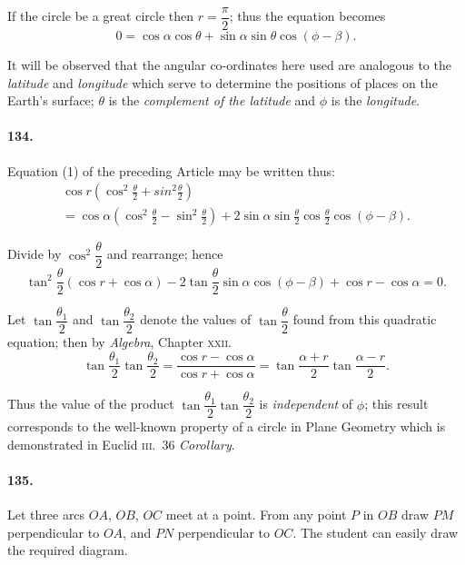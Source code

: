 \documentclass{book}[2004/02/16]
\begin{document}
\begin{mainmatter}
\begin{spacing}{1.3}
If the circle be a great circle then $r = \dfrac{\pi}{2}$; thus the equation
becomes
\[
0 = \cos \alpha \cos \theta + \sin \alpha \sin \theta \cos (\phi - \beta). \tag{2}
\]

It will be observed that the angular co-ordinates here used are
analogous to the \textit{latitude} and \textit{longitude} which serve to determine
the positions of places on the Earth's surface; $\theta$ is the \textit{complement
of the latitude} and $\phi$ is the \textit{longitude}.

\paragraph{134.} Equation (1) of the preceding Article may be written
thus:
\begin{multline*}
\cos r \left(\cos^2 \frac{\theta}{2} + sin^2 \frac{\theta}{2}\right)
\\
= \cos \alpha \left(\cos^2 \frac{\theta}{2}
                  - \sin^2 \frac{\theta}{2}\right)
+ 2 \sin \alpha \sin \frac{\theta}{2} \cos \frac{\theta}{2}
  \cos (\phi - \beta).
\end{multline*}

Divide by $\cos^2 \dfrac{\theta}{2}$ and rearrange; hence
\[
  \tan^2 \frac{\theta}{2} (\cos r + \cos \alpha)
- 2 \tan \frac{\theta}{2} \sin \alpha \cos (\phi - \beta)
+ \cos r - \cos \alpha = 0.
\]

Let $\tan \dfrac{\theta_1}{2}$ and $\tan \dfrac{\theta_2}{2}$ denote the values of $\tan \dfrac{\theta}{2}$ found from
this quadratic equation; then by \textit{Algebra}, Chapter \textsc{xxii.}
\[
  \tan \frac{\theta_1}{2} \tan \frac{\theta_2}{2}
= \frac{\cos r - \cos \alpha}{\cos r + \cos \alpha}
= \tan \frac{\alpha + r}{2} \tan \frac{\alpha - r}{2}.
\]

Thus the value of the product $\tan \dfrac{\theta_{1}}{2} \tan \dfrac{\theta_{2}}{2}$ is \textit{independent} of $\phi$;
this result corresponds to the well-known property of a circle in
Plane Geometry which is demonstrated in Euclid \textsc{iii.}\ 36 \textit{Corollary}.

\paragraph{135.} Let three arcs $OA$, $OB$, $OC$ meet at a point. From any
point $P$ in $OB$ draw $PM$ perpendicular to $OA$, and $PN$ perpendicular
to $OC$. The student can easily draw the required diagram.


\end{spacing}
\end{mainmatter}
\end{document}
